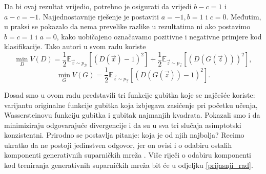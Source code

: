 Da bi ovaj rezultat vrijedio, potrebno je osigurati da vrijedi $b - c = 1$ i $a - c = -1$. Najjednostavnije rješenje je postaviti $a = -1, b = 1$ i $c = 0$. Međutim, u praksi se pokazalo da nema prevelike razlike u rezultatima ni ako postavimo $b = c = 1$ i $a = 0$, kako uobičajeno označavamo pozitivne i negativne primjere kod klasifikacije. Tako autori u svom radu koriste 
\begin{equation*}
\min_D V(D) = \frac{1}{2}\mathbb{E}_{\vec{x} \sim p_{\mathcal{D}}}\left[(D(\vec{x}) - 1)^2\right] + \frac{1}{2}\mathbb{E}_{\vec{z} \sim p_{\vec{z}}}\left[(D(G(\vec{z})))^2\right],
\end{equation*}
\begin{equation*}
\min_G V(G) = \frac{1}{2}\mathbb{E}_{\vec{z} \sim p_{\vec{z}}}\left[(D(G(\vec{z})) - 1)^2\right].
\end{equation*}


Dosad smo u ovom radu predstavili tri funkcije gubitka koje se najčešće koriste: varijantu originalne funkcije gubitka koja izbjegava zasićenje pri početku učenja, Wassersteinovu funkciju gubitka i gubitak najmanjih kvadrata. Pokazali smo i da minimiziraju odgovarajuće divergencije i da su u sva tri slučaja asimptotski konzistentni. Prirodno se postavlja pitanje: koja je od njih najbolja? Recimo ukratko da ne postoji jedinstven odgovor, jer on ovisi i o odabiru ostalih komponenti generativnih suparničkih mreža \citep{lucic2017gans}. Više riječi o odabiru komponenti kod treniranja generativnih suparničkih mreža bit će u odjeljku \ref{prijasnji_rad}. 